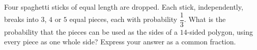 Four spaghetti sticks of equal length are dropped. Each stick, independently, breaks into $3$, $4$ or $5$ equal pieces, each with probability $\dfrac{1}{3}$. What is the probability that the pieces can be used as the sides of a $14$-sided polygon, using every piece as one whole side? Express your answer as a common fraction.
